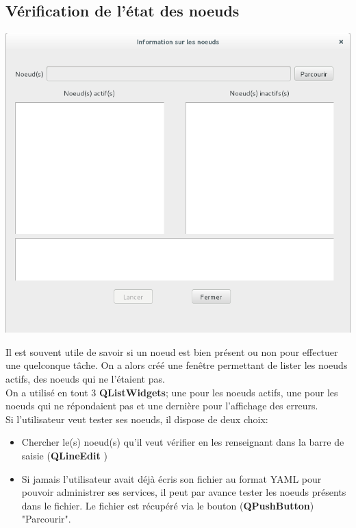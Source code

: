\documentclass[a4paper,11pt]{article}
\begin{document}
\subsection{Vérification de l'état des noeuds}

\begin{center}
\includegraphics[scale=0.6]{fen_etat_noeud.png} 
\end{center}

Il est souvent utile de savoir si un noeud est bien présent ou non pour effectuer une quelconque tâche. On a alors créé une fenêtre permettant de lister les noeuds actifs, des noeuds qui ne l'étaient pas.\\
On a utilisé en tout 3 \textbf{QListWidgets}; une pour les noeuds actifs, une pour les noeuds qui ne répondaient pas et une dernière pour l'affichage des erreurs.\\
Si l'utilisateur veut tester ses noeuds, il dispose de deux choix:
\begin{itemize}
 \item Chercher le(s) noeud(s) qu'il veut vérifier en les renseignant dans la barre de saisie (\textbf{QLineEdit} )
 \item Si jamais l'utilisateur avait déjà écris son fichier au format YAML pour pouvoir administrer ses services, il peut par avance tester les noeuds présents dans le fichier. Le fichier est récupéré via le bouton (\textbf{QPushButton}) "Parcourir".
 \end{itemize}
\end{document}
